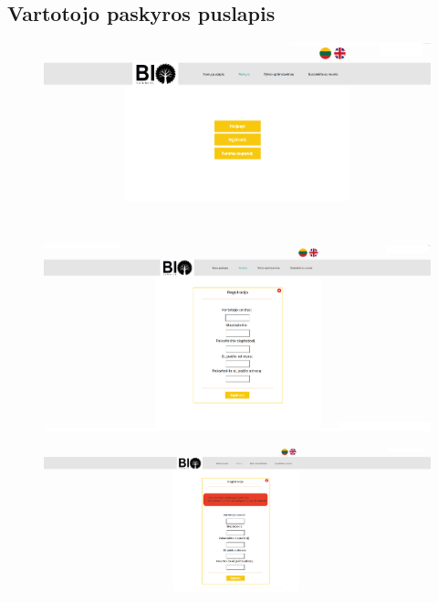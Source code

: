 \documentclass[a4paper,12pt]{article}
\begin{document}
\subsection{Vartotojo paskyros puslapis}
\begin{figure}[!tph]
\hspace{-2cm}
\centering
\includegraphics[scale=0.45]{interfeisai/paskyrosPuslapisNeprisijungta}
\label{fig:verticalcell}
\end{figure}

\begin{figure}[!tph]
\hspace{-2cm}
\centering
\includegraphics[scale=0.45]{interfeisai/paskyrosPuslapisRegistracija}
\label{fig:verticalcell}
\end{figure}

\begin{figure}[!tph]
\hspace{-2cm}
\centering
\includegraphics[scale=0.45]{interfeisai/paskyrosPuslapisRegistracijaSuKlaida}
\label{fig:verticalcell}
\end{figure}
\end{document}

